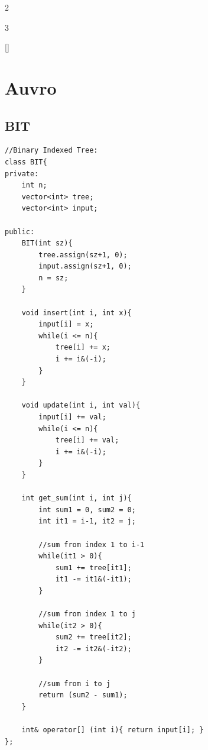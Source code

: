 \documentclass[twoside]{article}
\begin{document}
\begin{multicols*}{2}
    \tableofcontents
\end{multicols*}
\begin{multicols*}{3}
{
[\vspace{2em}]
\section*{Auvro}
}
{
\subsection*{BIT}
}
\begin{verbatim}
//Binary Indexed Tree:
class BIT{
private:
    int n;
    vector<int> tree;
    vector<int> input;

public:
    BIT(int sz){ 
        tree.assign(sz+1, 0); 
        input.assign(sz+1, 0); 
        n = sz; 
    }

    void insert(int i, int x){
        input[i] = x;
        while(i <= n){
            tree[i] += x;
            i += i&(-i);
        }
    }

    void update(int i, int val){
        input[i] += val;
        while(i <= n){
            tree[i] += val;
            i += i&(-i);
        }
    }

    int get_sum(int i, int j){
        int sum1 = 0, sum2 = 0;
        int it1 = i-1, it2 = j;

        //sum from index 1 to i-1
        while(it1 > 0){
            sum1 += tree[it1];
            it1 -= it1&(-it1);
        }

        //sum from index 1 to j
        while(it2 > 0){
            sum2 += tree[it2];
            it2 -= it2&(-it2);
        }

        //sum from i to j
        return (sum2 - sum1);
    }

    int& operator[] (int i){ return input[i]; }
};
\end{verbatim}


\end{multicols*}
\end{document}

